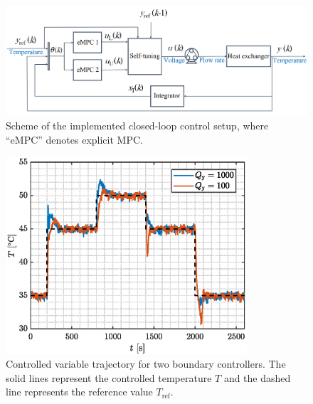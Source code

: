 \documentclass[preprint,12pt]{elsarticle}
\begin{document}
\begin{figure}
	\begin{center}
		\includegraphics[width=\textwidth]{images/cl3}
		\caption[Scheme of the implemented closed-loop control setup.]{Scheme of the implemented closed-loop control setup, where ``eMPC'' denotes explicit MPC.}
		\label{fig:CL}
	\end{center}
\end{figure}

\begin{figure}
	\begin{center}
		\includegraphics[width=0.8\textwidth]{images/CV_boundaries}
		\caption{Controlled variable trajectory for two boundary controllers. The solid lines represent the controlled temperature $T$ and the dashed line represents the reference value $T_{\mathrm{ref}}$.}
		\label{fig:CV_boundaries}
	\end{center}
\end{figure}
\end{document}

